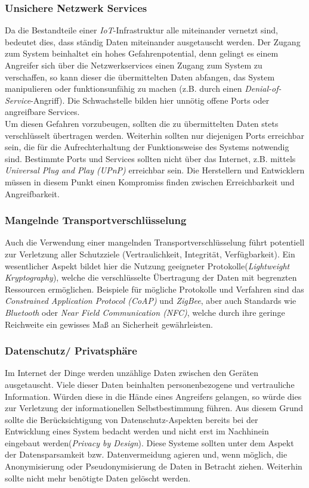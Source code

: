 \documentclass[conference]{IEEEtran}
\begin{document}
\subsubsection{Unsichere Netzwerk Services}
Da die Bestandteile einer \textit{IoT}-Infrastruktur alle miteinander vernetzt sind, bedeutet dies, dass ständig Daten miteinander ausgetauscht werden. Der Zugang zum System beinhaltet ein hohes Gefahrenpotential, denn gelingt es einem Angreifer sich über die Netzwerkservices einen Zugang zum System zu verschaffen, so kann dieser  die übermittelten Daten abfangen, das System manipulieren oder funktionsunfähig zu machen (z.B. durch einen \textit{Denial-of-Service}-Angriff). Die Schwachstelle bilden hier unnötig offene Ports oder angreifbare Services. \\
Um diesen Gefahren vorzubeugen, sollten die zu übermittelten Daten stets verschlüsselt übertragen werden. Weiterhin sollten nur diejenigen Ports erreichbar sein, die für die Aufrechterhaltung der Funktionsweise des Systems notwendig sind. Bestimmte Ports und Services sollten nicht über das Internet, z.B. mittels \textit{Universal Plug and Play (UPnP)} erreichbar sein\cite{owasp}. Die Herstellern und Entwicklern müssen in diesem Punkt einen Kompromiss finden zwischen Erreichbarkeit und Angreifbarkeit. \\
\subsubsection{Mangelnde Transportverschlüsselung}
Auch die Verwendung einer mangelnden Transportverschlüsselung führt potentiell zur Verletzung aller Schutzziele (Vertraulichkeit, Integrität, Verfügbarkeit). Ein wesentlicher Aspekt bildet hier die Nutzung geeigneter Protokolle(\textit{Lightweight Kryptography})\cite{owasp}, welche die verschlüsselte Übertragung der Daten mit begrenzten Ressourcen ermöglichen. Beispiele für mögliche Protokolle und Verfahren sind das \textit{Constrained Application Protocol (CoAP)} und \textit{ZigBee}, aber auch Standards wie \textit{Bluetooth} oder \textit{Near Field Communication (NFC)}, welche durch ihre geringe Reichweite ein gewisses Maß an Sicherheit gewährleisten\cite{lowpow}\cite{zigbee}.\\
\subsubsection{Datenschutz/ Privatsphäre}
Im Internet der Dinge werden unzählige Daten zwischen den Geräten ausgetauscht. Viele dieser Daten beinhalten personenbezogene und vertrauliche Information. Würden diese in die Hände eines Angreifers gelangen, so würde dies zur Verletzung der informationellen Selbstbestimmung führen. Aus diesem Grund sollte die Berücksichtigung von Datenschutz-Aspekten bereits bei der Entwicklung eines System bedacht werden und nicht erst im Nachhinein eingebaut werden(\textit{Privacy by Design})\cite{seciot}. Diese Systeme sollten unter dem Aspekt der Datensparsamkeit bzw. Datenvermeidung agieren und, wenn möglich, die Anonymisierung oder Pseudonymisierung de Daten in Betracht ziehen. Weiterhin sollte nicht mehr benötigte Daten gelöscht werden. 
\end{document}
